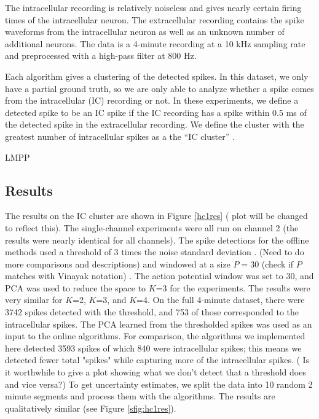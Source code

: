 The intracellular recording is relatively noiseless and gives nearly certain firing times of the intracellular neuron.  The extracellular recording contains the spike waveforms from the intracellular neuron as well as an unknown number of additional neurons.  The data is a 4-minute recording at a 10 kHz sampling rate and preprocessed with a high-pass filter at 800 Hz. 

Each algorithm gives a clustering of the detected spikes.  In this dataset, we only have a partial ground truth, so we are only able to analyze whether a spike comes from the intracellular (IC) recording or not.  In these experiments, we define a detected spike to be an IC spike if the IC recording has a spike within 0.5 ms  of the detected spike in the extracellular recording.  We define the cluster with the greatest number of intracellular spikes as a the ``IC cluster'' .   


LMPP

\subsection{Results}

The results on the IC cluster are shown in Figure \ref{hc1res} ({\color{red} plot will be changed to reflect this}).  The single-channel experiments were all run on channel 2 (the results were nearly identical for all channels).  The spike detections for the offline methods used a threshold of 3 times the noise standard deviation \cite{Lewicki}. (Need to do more comparisons and descriptions) and windowed at a size $P=30$ (check if $P$ matches with Vinayak notation) .  The action potential window was set to 30, and PCA was used to reduce the space to $K$=3 for the experiments.  The results were very similar for $K$=2, $K$=3, and $K$=4.   On the full 4-minute dataset, there were 3742 spikes detected with the threshold, and 753 of those corresponded to the intracellular spikes.  The PCA learned from the thresholded spikes was used as an input to the online algorithms.  For comparison, the algorithms we implemented here detected 3593 spikes of which 840 were intracellular spikes; this means we detected fewer total "spikes" while capturing more of the intracellular spikes. ({\color{red}  Is it worthwhile to give a plot showing what we don't detect that a threshold does and vice versa?})
To get uncertainty estimates, we split the data into 10 random 2 minute segments and process them with the algorithms. The results are qualitatively similar (see Figure \ref{sfig:hc1res}).


